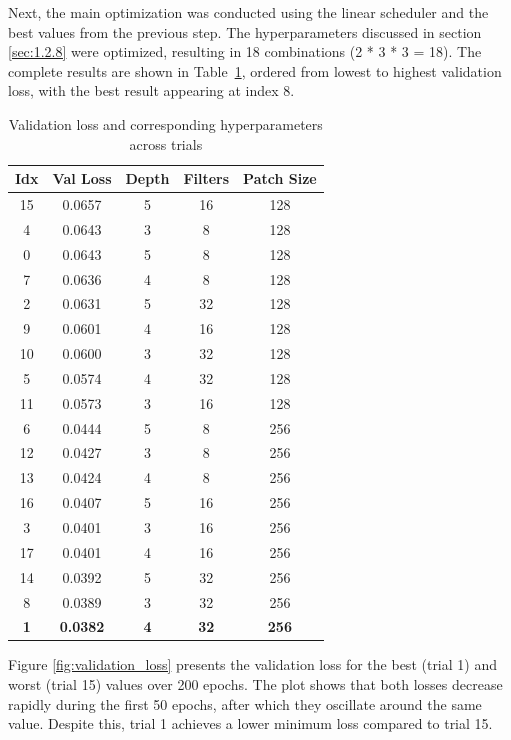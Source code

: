 Next, the main optimization was conducted using the linear scheduler and the best values from the previous step. The hyperparameters discussed in section \ref{sec:1.2.8} were optimized, resulting in 18 combinations (2 * 3 * 3 = 18). The complete results are shown in Table~\ref{tab:main_results}, ordered from lowest to highest validation loss, with the best result appearing at index 8.
\begin{table}[H]
    \centering
    \caption{Validation loss and corresponding hyperparameters across trials}
    \renewcommand{\arraystretch}{1.1}

    \begin{tabular}{ccccc}
        \toprule
        \textbf{Idx} & \textbf{Val Loss} & \textbf{Depth} & \textbf{Filters} & \textbf{Patch Size} \\
        \midrule
        15 & 0.0657 & 5 & 16 & 128 \\
        4  & 0.0643 & 3 & 8  & 128 \\
        0  & 0.0643 & 5 & 8  & 128 \\
        7  & 0.0636 & 4 & 8  & 128 \\
        2  & 0.0631 & 5 & 32 & 128 \\
        9  & 0.0601 & 4 & 16 & 128 \\
        10 & 0.0600 & 3 & 32 & 128 \\
        5  & 0.0574 & 4 & 32 & 128 \\
        11 & 0.0573 & 3 & 16 & 128 \\
        6  & 0.0444 & 5 & 8  & 256 \\
        12 & 0.0427 & 3 & 8  & 256 \\
        13 & 0.0424 & 4 & 8  & 256 \\
        16 & 0.0407 & 5 & 16 & 256 \\
        3  & 0.0401 & 3 & 16 & 256 \\
        17 & 0.0401 & 4 & 16 & 256 \\
        14 & 0.0392 & 5 & 32 & 256 \\
        8  & 0.0389 & 3 & 32 & 256 \\
        \textbf{1}  & \textbf{0.0382} & \textbf{4} & \textbf{32} & \textbf{256} \\

        \bottomrule
    \end{tabular}
    \label{tab:main_results}
\end{table}


Figure \ref{fig:validation_loss} presents the validation loss for the best (trial 1) and worst (trial 15) values over 200 epochs. The plot shows that both losses decrease rapidly during the first 50 epochs, after which they oscillate around the same value. Despite this, trial 1 achieves a lower minimum loss compared to trial 15.

